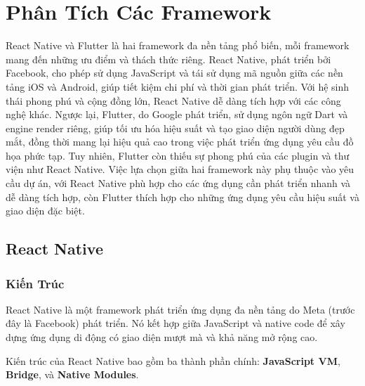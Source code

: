 \section{Phân Tích Các Framework}
\begin{flushleft}
  \hspace*{0.8cm}React Native và Flutter là hai framework đa nền tảng phổ biến, mỗi framework mang đến những ưu điểm và thách thức riêng. React Native, phát triển bởi Facebook, cho phép sử dụng JavaScript và tái sử dụng mã nguồn giữa các nền tảng iOS và Android, giúp tiết kiệm chi phí và thời gian phát triển. Với hệ sinh thái phong phú và cộng đồng lớn, React Native dễ dàng tích hợp với các công nghệ khác. Ngược lại, Flutter, do Google phát triển, sử dụng ngôn ngữ Dart và engine render riêng, giúp tối ưu hóa hiệu suất và tạo giao diện người dùng đẹp mắt, đồng thời mang lại hiệu quả cao trong việc phát triển ứng dụng yêu cầu đồ họa phức tạp. Tuy nhiên, Flutter còn thiếu sự phong phú của các plugin và thư viện như React Native. Việc lựa chọn giữa hai framework này phụ thuộc vào yêu cầu dự án, với React Native phù hợp cho các ứng dụng cần phát triển nhanh và dễ dàng tích hợp, còn Flutter thích hợp cho những ứng dụng yêu cầu hiệu suất và giao diện đặc biệt.
\end{flushleft}

\subsection{React Native}
\renewcommand{\labelitemi}{--}    
\subsubsection{Kiến Trúc}

\begin{sloppypar}
\hspace*{1.5em}React Native là một framework phát triển ứng dụng đa nền tảng do Meta (trước đây là Facebook) phát triển.  
Nó kết hợp giữa JavaScript và native code để xây dựng ứng dụng di động có giao diện mượt mà và khả năng mở rộng cao.
\end{sloppypar}

\begin{sloppypar}
Kiến trúc của React Native bao gồm ba thành phần chính: \textbf{JavaScript VM}, \textbf{Bridge}, và \textbf{Native Modules}.
\end{sloppypar}

